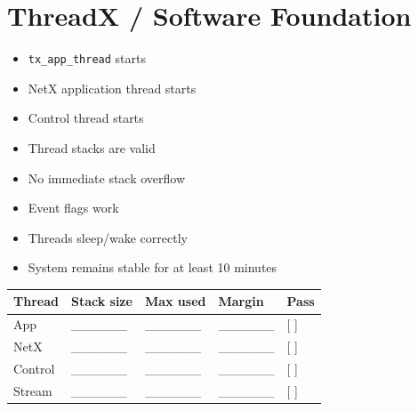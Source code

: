 \documentclass[10pt,a4paper,oneside]{report}
\providecommand{\tightlist}{\setlength{\itemsep}{1pt}\setlength{\parskip}{1pt}}
\begin{document}
\section{ThreadX / Software Foundation}\label{wiki-hardware-bring-up-and-testing--6-threadx--software-foundation}

\begin{itemize}
\tightlist
\item[$\square$]
  \texttt{tx\_\allowbreak{}app\_\allowbreak{}thread} starts
\item[$\square$]
  NetX application thread starts
\item[$\square$]
  Control thread starts
\item[$\square$]
  Thread stacks are valid
\item[$\square$]
  No immediate stack overflow
\item[$\square$]
  Event flags work
\item[$\square$]
  Threads sleep/wake correctly
\item[$\square$]
  System remains stable for at least 10 minutes
\end{itemize}

{\def\LTcaptype{none} %
\begin{longtable}[]{@{}
  >{\raggedright\arraybackslash}p{}
  >{\raggedleft\arraybackslash}p{}
  >{\raggedleft\arraybackslash}p{}
  >{\raggedleft\arraybackslash}p{}
  >{\centering\arraybackslash}p{}@{}}
\toprule\noalign{}
\begin{minipage}[b]{\linewidth}\raggedright
\textbf{Thread}
\end{minipage} & \begin{minipage}[b]{\linewidth}\raggedleft
\textbf{Stack size}
\end{minipage} & \begin{minipage}[b]{\linewidth}\raggedleft
\textbf{Max used}
\end{minipage} & \begin{minipage}[b]{\linewidth}\raggedleft
\textbf{Margin}
\end{minipage} & \begin{minipage}[b]{\linewidth}\centering
\textbf{Pass}
\end{minipage} \\
\midrule\noalign{}
\endhead
\bottomrule\noalign{}
\endlastfoot
App & \_\_\_\_\_\_ & \_\_\_\_\_\_ & \_\_\_\_\_\_ & {[} {]} \\
NetX & \_\_\_\_\_\_ & \_\_\_\_\_\_ & \_\_\_\_\_\_ & {[} {]} \\
Control & \_\_\_\_\_\_ & \_\_\_\_\_\_ & \_\_\_\_\_\_ & {[} {]} \\
Stream & \_\_\_\_\_\_ & \_\_\_\_\_\_ & \_\_\_\_\_\_ & {[} {]} \\
\end{longtable}
}
\end{document}
